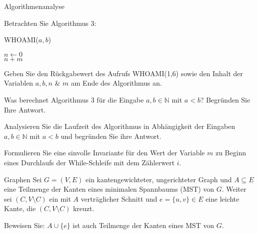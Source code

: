 \documentclass{article}
\begin{document}
\begin{eexercises}{Algorithmenanalyse}{
    Betrachten Sie Algorithmus 3:
    \begin{algorithm}[ht]
      \caption{WHOAMI($a, b$)}
      $n \gets 0$ \\
      \Return $n + m$
    \end{algorithm}
  }
  \item Geben Sie den Rückgabewert des Aufrufs WHOAMI(1,6) sowie den Inhalt der Variablen $a, b, n$ \& $m$ am Ende des Algorithmus an.
  \item Was berechnet Algorithmus 3 für die Eingabe $a, b \in \mathbb{N}$ mit $a < b$? Begründen Sie Ihre Antwort.
  \item Analysieren Sie die Laufzeit des Algorithmus in Abhängigkeit der Eingaben $a, b \in \mathbb{N}$ mit $a < b$ und begründen Sie ihre Antwort.
  \item Formulieren Sie eine sinvolle Invariante für den Wert der Variable $m$ zu Beginn eines Durchlaufs der While-Schleife mit dem Zählerwert $i$.
\end{eexercises}

\begin{exercise}{Graphen}
  Sei $G = (V, E)$ ein kantengewichteter, ungerichteter Graph und $A \subseteq E$ eine Teilmenge der Kanten eines minimalen Spannbaums (MST) von $G$. Weiter sei $(C, V \setminus C)$ ein mit $A$ verträglicher Schnitt und $e = \{u, v\} \in E$ eine leichte Kante, die $(C, V \setminus C)$ kreuzt.\par
  Beweisen Sie: $A \cup \{e\}$ ist auch Teilmenge der Kanten eines MST von $G$.
\end{exercise}
\end{document}
